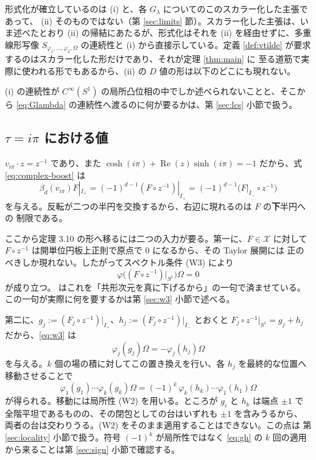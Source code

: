 \documentclass[11pt,a4paper]{article}
\newcommand{\Circ}{S^{1}}
\newcommand{\Xcl}{\mathcal{X}}
\newcommand{\Dom}{D}
\theoremstyle{definition}
\begin{document}
形式化が確立しているのは (i) と、各 $G_\lambda$ についてのこのスカラー化した主張であって、
(ii) そのものではない（第 \ref{sec:limits} 節）。スカラー化した主張は、いま述べたとおり
(ii) の帰結にあたるが、形式化はそれを (ii) を経由せずに、多重線形写像
$S_{\varphi_1,\dots,\varphi_k,\Omega}$ の連続性と (i) から直接示している。定義
\ref{def:vtilde} が要求するのはスカラー化した形だけであり、それが定理 \ref{thm:main} に
至る道筋で実際に使われる形でもあるから、(ii) の $\Dom$ 値の形は以下のどこにも現れない。

(i) の連続性が $C^\infty(\Circ)$ の局所凸位相の中でしか述べられないことと、そこから
\eqref{eq:Glambda} の連続性へ渡るのに何が要るかは、第 \ref{sec:lcs} 小節で扱う。

\subsection{\texorpdfstring{$\tau = i\pi$ における値}{tau = i*pi における値}}

$v_{i\pi}\cdot z = z^{-1}$ であり、また $\cosh(i\pi) + \operatorname{Re}(z)\sinh(i\pi) = -1$
だから、式 \eqref{eq:complex-boost} は
\begin{equation}
  \label{eq:beta-ipi}
  \beta_d(v_{i\pi}) F|_{I_+} = (-1)^{d-1} (F \circ z^{-1})|_{I_+}
  = (-1)^{d-1} \bigl(F|_{I_-} \circ z^{-1}\bigr)
\end{equation}
を与える。反転が二つの半円を交換するから、右辺に現れるのは $F$ の\textbf{下}半円への
制限である。

ここから定理 3.10 の形へ移るには二つの入力が要る。第一に、$F \in \Xcl$ に対して
$F \circ z^{-1}$ は開単位円板上正則で原点で $0$ になるから、その Taylor 展開には
正のべきしか現れない。したがってスペクトル条件 (W3) により
\begin{equation}
  \label{eq:w3}
  \varphi\bigl((F \circ z^{-1})|_{\Circ}\bigr)\Omega = 0
\end{equation}
が成り立つ。\cite{T26} はこれを「共形次元を真に下げるから」の一句で済ませている。
この一句が実際に何を要するかは第 \ref{sec:w3} 小節で述べる。

第二に、$g_j := (F_j \circ z^{-1})|_{I_+}$、$h_j := (F_j \circ z^{-1})|_{I_-}$ とおくと
$F_j \circ z^{-1}|_{\Circ} = g_j + h_j$ だから、\eqref{eq:w3} は
\begin{equation}
  \label{eq:gh}
  \varphi_j(g_j)\Omega = -\varphi_j(h_j)\Omega
\end{equation}
を与える。$k$ 個の場の積に対してこの置き換えを行い、各 $h_j$ を最終的な位置へ
移動させることで
\begin{equation}
  \label{eq:sign-reversal}
  \varphi_1(g_1)\cdots\varphi_k(g_k)\Omega = (-1)^{k}\, \varphi_k(h_k)\cdots\varphi_1(h_1)\Omega
\end{equation}
が得られる。移動には局所性 (W2) を用いる。ところが $g_i$ と $h_k$ は端点 $\pm 1$ で
全階平坦であるものの、その閉包としての台はいずれも $\pm 1$ を含みうるから、
両者の台は交わりうる。(W2) をそのまま適用することはできない。この点は
第 \ref{sec:locality} 小節で扱う。符号 $(-1)^k$ が局所性ではなく \eqref{eq:gh} の
$k$ 回の適用から来ることは第 \ref{sec:sign} 小節で確認する。
\end{document}
